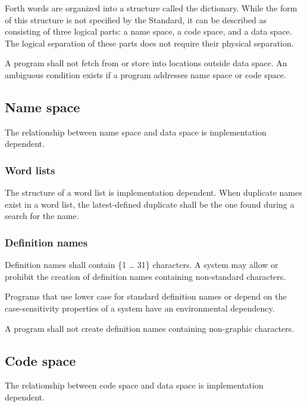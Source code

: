 Forth words are organized into a structure called the dictionary.
While the form of this structure is not specified by the Standard,
it can be described as consisting of three logical parts:
a name space, a code space, and a data space. The logical separation
of these parts does not require their physical separation.

A program shall not fetch from or store into locations outside data
space. An ambiguous condition exists if a program addresses name
space or code space.

\subsection{Name space} %

The relationship between name space and data space is implementation
dependent.

\subsubsection{Word lists} %

The structure of a word list is implementation dependent. When
duplicate names exist in a word list, the latest-defined duplicate
shall be the one found during a search for the name.

\subsubsection{Definition names} %
\label{usage:names}

Definition names shall contain \{1 {\ldots} 31\} characters.
A system may allow or prohibit the creation of definition names
containing non-standard characters.

Programs that use lower case for standard definition names or depend
on the case-sensitivity properties of a system have an environmental
dependency.

A program shall not create definition names containing non-graphic
characters.

\subsection{Code space} %

The relationship between code space and data space is implementation
dependent.


